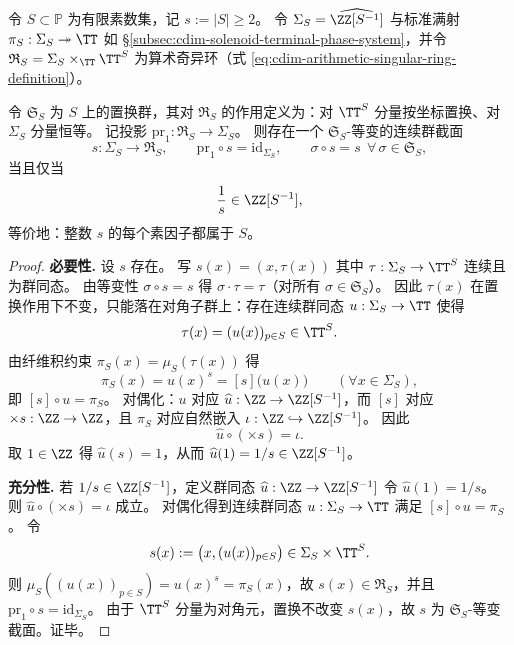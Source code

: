 \begin{theorem}[素数置换对称下的等变分裂判别]\label{thm:cdim-arithmetic-singular-ring-equivariant-splitting-criterion}
令 \(S\subset\mathbb{P}\) 为有限素数集，记 \(s:=|S|\ge 2\)。
令 \(\Sigma_S=\widehat{\ZZ[S^{-1}]}\) 与标准满射 \(\pi_S:\Sigma_S\twoheadrightarrow\TT\) 如 \S\ref{subsec:cdim-solenoid-terminal-phase-system}，并令
\(\mathfrak{R}_S=\Sigma_S\times_{\TT}\TT^{S}\)
为算术奇异环（式 \eqref{eq:cdim-arithmetic-singular-ring-definition}）。
\par
令 \(\mathfrak{S}_S\) 为 \(S\) 上的置换群，其对 \(\mathfrak{R}_S\) 的作用定义为：对 \(\TT^{S}\) 分量按坐标置换、对 \(\Sigma_S\) 分量恒等。
记投影 \(\mathrm{pr}_1:\mathfrak{R}_S\to \Sigma_S\)。
则存在一个 \(\mathfrak{S}_S\)-等变的连续群截面
\[
s:\Sigma_S\to \mathfrak{R}_S,
\qquad
\mathrm{pr}_1\circ s=\mathrm{id}_{\Sigma_S},
\qquad
\sigma\circ s=s\ \ \forall\,\sigma\in\mathfrak{S}_S,
\]
当且仅当
\[
\frac{1}{s}\in \ZZ[S^{-1}],
\]
等价地：整数 \(s\) 的每个素因子都属于 \(S\)。
\end{theorem}

\begin{proof}
\textbf{必要性.}
设 \(s\) 存在。
写
\(
s(x)=(x,\tau(x))
\)
其中 \(\tau:\Sigma_S\to \TT^{S}\) 连续且为群同态。
由等变性 \(\sigma\circ s=s\) 得 \(\sigma\cdot\tau=\tau\)（对所有 \(\sigma\in\mathfrak{S}_S\)）。
因此 \(\tau(x)\) 在置换作用下不变，只能落在对角子群上：存在连续群同态 \(u:\Sigma_S\to\TT\) 使得
\[
\tau(x)=(u(x))_{p\in S}\in \TT^{S}.
\]
由纤维积约束 \(\pi_S(x)=\mu_S(\tau(x))\) 得
\[
\pi_S(x)=u(x)^s=[s]\bigl(u(x)\bigr)\qquad(\forall x\in\Sigma_S),
\]
即 \([s]\circ u=\pi_S\)。
对偶化：\(u\) 对应 \(\widehat u:\ZZ\to \ZZ[S^{-1}]\)，而 \([s]\) 对应 \(\times s:\ZZ\to\ZZ\)，且 \(\pi_S\) 对应自然嵌入 \(\iota:\ZZ\hookrightarrow \ZZ[S^{-1}]\)。
因此
\[
\widehat u\circ(\times s)=\iota.
\]
取 \(1\in\ZZ\) 得 \(\widehat u(s)=1\)，从而 \(\widehat u(1)=1/s\in\ZZ[S^{-1}]\)。
\par
\textbf{充分性.}
若 \(1/s\in \ZZ[S^{-1}]\)，定义群同态 \(\widehat u:\ZZ\to\ZZ[S^{-1}]\) 令 \(\widehat u(1)=1/s\)。
则 \(\widehat u\circ(\times s)=\iota\) 成立。
对偶化得到连续群同态 \(u:\Sigma_S\to \TT\) 满足 \([s]\circ u=\pi_S\)。
令
\[
s(x):=\bigl(x,(u(x))_{p\in S}\bigr)\in \Sigma_S\times \TT^{S}.
\]
则 \(\mu_S((u(x))_{p\in S})=u(x)^s=\pi_S(x)\)，故 \(s(x)\in\mathfrak{R}_S\)，并且 \(\mathrm{pr}_1\circ s=\mathrm{id}_{\Sigma_S}\)。
由于 \(\TT^{S}\) 分量为对角元，置换不改变 \(s(x)\)，故 \(s\) 为 \(\mathfrak{S}_S\)-等变截面。证毕。
\end{proof}

\endinput

